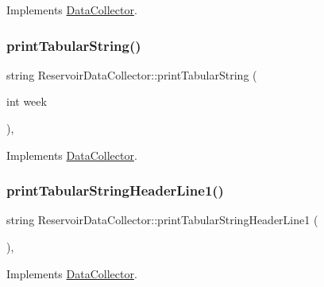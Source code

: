 Implements \mbox{\hyperlink{classDataCollector_a98dcb4ec871d9c7fbf7545c64e5ccc67}{Data\+Collector}}.

\mbox{\label{classReservoirDataCollector_a81777b029bf26be403b9f4d67f01588b}} 
\subsubsection{\texorpdfstring{print\+Tabular\+String()}{printTabularString()}}
{\footnotesize\ttfamily string Reservoir\+Data\+Collector\+::print\+Tabular\+String (\begin{DoxyParamCaption}\item[{int}]{week }\end{DoxyParamCaption})\hspace{0.3cm}{\ttfamily [override]}, {\ttfamily [virtual]}}



Implements \mbox{\hyperlink{classDataCollector_a397fccabe0223267eea8fc7cac0e59da}{Data\+Collector}}.

\mbox{\label{classReservoirDataCollector_a62e7c7abc34c8154b338dfbd284ed665}} 
\subsubsection{\texorpdfstring{print\+Tabular\+String\+Header\+Line1()}{printTabularStringHeaderLine1()}}
{\footnotesize\ttfamily string Reservoir\+Data\+Collector\+::print\+Tabular\+String\+Header\+Line1 (\begin{DoxyParamCaption}{ }\end{DoxyParamCaption})\hspace{0.3cm}{\ttfamily [override]}, {\ttfamily [virtual]}}



Implements \mbox{\hyperlink{classDataCollector_a91619cfa9e9b8cefd2f7c20d5718b41e}{Data\+Collector}}.

